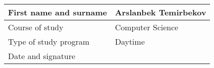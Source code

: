 \\[5mm]
\begin{tabular}{|p{}|p{}|}
    \hline
    First name and surname & Arslanbek Temirbekov \\
    \hline
    Course of study        & Computer Science     \\
    \hline
    Type of study program  & Daytime              \\
    \hline
    Date and signature     &                      \\
    \hline
\end{tabular}